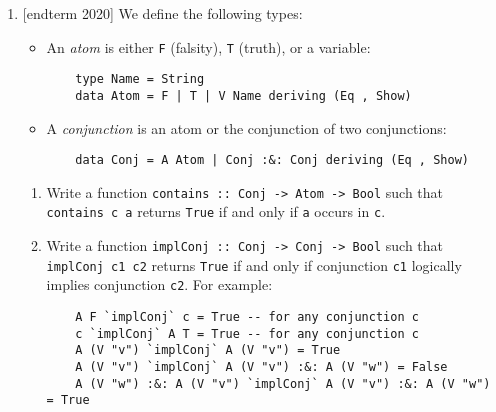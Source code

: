 \documentclass{article}
\def\code#1{\texttt{#1}}
\begin{document}
\begin{enumerate}
    \item {[endterm 2020]} We define the following types:
        \begin{itemize}
            \item An \textit{atom} is either \code{F} (falsity), \code{T} (truth), or a variable:
                \begin{verbatim}
    type Name = String
    data Atom = F | T | V Name deriving (Eq , Show)
                \end{verbatim}
            \item A \textit{conjunction} is an atom or the conjunction of two conjunctions:
                \begin{verbatim}
    data Conj = A Atom | Conj :&: Conj deriving (Eq , Show)
                \end{verbatim}
        \end{itemize}
        \begin{enumerate}
            \item Write a function \code{contains :: Conj -> Atom -> Bool} such that \code{contains c a} returns \code{True} if and only if \code{a} occurs in \code{c}.
            \item Write a function \code{implConj :: Conj -> Conj -> Bool} such that \code{implConj c1 c2} returns \code{True} if and only if conjunction \code{c1} logically implies conjunction \code{c2}. For example:
                \begin{verbatim}
    A F `implConj` c = True -- for any conjunction c
    c `implConj` A T = True -- for any conjunction c
    A (V "v") `implConj` A (V "v") = True
    A (V "v") `implConj` A (V "v") :&: A (V "w") = False
    A (V "w") :&: A (V "v") `implConj` A (V "v") :&: A (V "w") = True
                \end{verbatim}
        \end{enumerate}


\end{enumerate}
\end{document}
